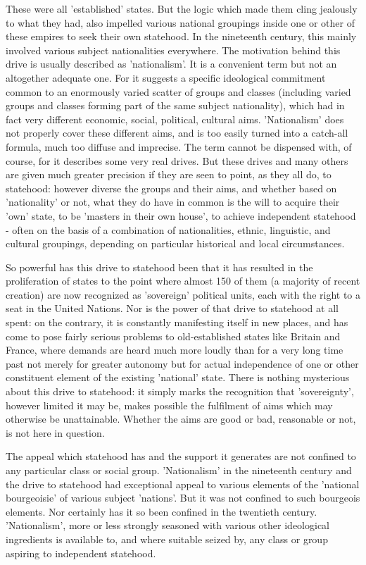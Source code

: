 These were all 'established' states. But the logic which made them cling jealously to what they had, also impelled various national groupings inside one or other of these empires to seek their own statehood. In the nineteenth century, this mainly involved various subject nationalities everywhere. The motivation behind this drive is usually described as 'nationalism'. It is a  convenient term but not an altogether adequate one. For it suggests a specific ideological commitment common to an enormously varied scatter of groups and classes (including varied groups and classes forming part of the same subject nationality), which had in fact very different economic, social, political, cultural aims. 'Nationalism' does not properly cover these different aims, and is too easily turned into a catch-all formula, much too diffuse and imprecise. The term cannot be dispensed with, of course, for it describes some very real drives. But these drives and many others are given much greater precision if they are seen to point, as they all do, to statehood: however diverse the groups and their aims, and whether based on 'nationality' or not, what they do have in common is the will to acquire their 'own' state, to be 'masters in their own house', to achieve independent statehood - often on the basis of a combination of nationalities, ethnic, linguistic, and cultural groupings, depending on particular historical and local circumstances.

So powerful has this drive to statehood been that it has resulted in the proliferation of states to the point where almost 150 of them (a majority of recent creation) are now recognized as 'sovereign' political units, each with the right to a seat in the United Nations. Nor is the power of that drive to statehood at all spent: on the contrary, it is constantly manifesting itself in new places, and has come to pose fairly serious problems to old\hyp{}established states like Britain and France, where demands are heard much more loudly than for a very long time past not merely for greater autonomy but for actual independence of one or other constituent element of the existing 'national' state. There is nothing mysterious about this drive to statehood: it simply marks the recognition that 'sovereignty', however limited it may be, makes possible the fulfilment of aims which may otherwise be unattainable. Whether the aims are good or bad, reasonable or not, is not here in question.

The appeal which statehood has and the support it generates are not confined to any particular class or social group. 'Nationalism' in the nineteenth century and the drive to statehood had exceptional appeal to various elements of the 'national bourgeoisie' of various subject 'nations'. But it was not confined to such bourgeois elements. Nor certainly has it so been confined in the twentieth century. 'Nationalism', more or less strongly seasoned with various other ideological ingredients is available to, and where suitable seized by, any class or group aspiring to independent statehood.

